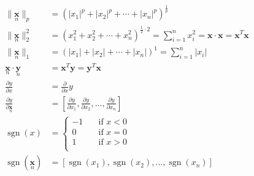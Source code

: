 \newcommand{\matrix}[1]{\mathbf{#1}}
\newcommand{\vector}[1]{\mathbf{#1}}
\DeclareMathOperator{\sgn}{sgn}
\begin{align*}
\|\underset{n}{\vector{x}}\|_p &= \left( |x_1|^p + |x_2|^p + \cdots + |x_n|^p \right)^\frac{1}{p} \\
\|\underset{n}{\vector{x}}\|_2^2 &= \left( x_1^2 + x_2^2 + \cdots + x_n^2 \right)^{\frac{1}{2} \cdot 2} = \sum_{i=1}^{n}{x_i^2} = \vector{x} \cdot \vector{x} = \vector{x}^T\vector{x} \\
\|\underset{n}{\vector{x}}\|_1 &= \left( |x_1| + |x_2| + \cdots + |x_n| \right)^1 = \sum_{i=1}^{n}{|x_i|} \\
\underset{n}{\vector{x}} \cdot \underset{n}{\vector{y}} &= \vector{x}^T\vector{y} = \vector{y}^T\vector{x} \\
\frac{\partial y}{\partial x} &= \frac{\partial}{\partial x}y \\
\frac{\partial y}{\partial \underset{n}{\vector{x}}} &= \left[ \frac{\partial y}{\partial x_1}, \frac{\partial y}{\partial x_2}, \ldots, \frac{\partial y}{\partial x_n} \right] \\
\sgn(x) &=
\begin{cases}
    -1 & \quad \text{if } x < 0 \\
     0 & \quad \text{if } x = 0 \\
     1 & \quad \text{if } x > 0 \\
\end{cases} \\
\sgn(\underset{n}{\vector{x}}) &= \left[ \sgn(x_1), \sgn(x_2), \ldots, \sgn(x_n) \right] \\
\end{align*}
